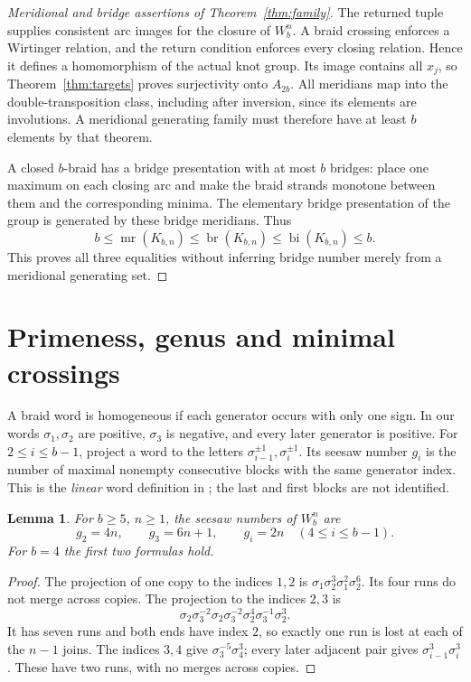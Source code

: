 \documentclass[11pt]{article}
\newtheorem{lemma}[theorem]{Lemma}
\newcommand{\mr}{\operatorname{mr}}
\newcommand{\br}{\operatorname{br}}
\newcommand{\bi}{\operatorname{bi}}
\begin{document}
\begin{proof}[Meridional and bridge assertions of Theorem~\ref{thm:family}]
The returned tuple supplies consistent arc images for the closure of
$W_b^n$. A braid crossing enforces a Wirtinger relation, and the return
condition enforces every closing relation. Hence it defines a
homomorphism of the actual knot group. Its image contains all $x_j$,
so Theorem~\ref{thm:targets} proves surjectivity onto $A_{2b}$.
All meridians map into the double-transposition class, including after
inversion, since its elements are involutions. A meridional generating
family must therefore have at least $b$ elements by that theorem.

A closed $b$-braid has a bridge presentation with at most $b$ bridges:
place one maximum on each closing arc and make the braid strands
monotone between them and the corresponding minima. The elementary
bridge presentation of the group is generated by these bridge
meridians. Thus
\[
 b\le\mr(K_{b,n})\le\br(K_{b,n})\le\bi(K_{b,n})\le b.
\]
This proves all three equalities without inferring bridge number merely
from a meridional generating set.
\end{proof}

\section{Primeness, genus and minimal crossings}

A braid word is homogeneous if each generator occurs with only one
sign. In our words $\sigma_1,\sigma_2$ are positive, $\sigma_3$ is
negative, and every later generator is positive.
For $2\le i\le b-1$, project a word to the letters
$\sigma_{i-1}^{\pm1},\sigma_i^{\pm1}$. Its seesaw number $g_i$ is the
number of maximal nonempty consecutive blocks with the same generator
index. This is the \emph{linear} word definition in
\cite[Section~5.2, printed p.~20]{flo}; the last and first blocks are not
identified.

\begin{lemma}\label{lem:seesaws}
For $b\ge5$, $n\ge1$, the seesaw numbers of $W_b^n$ are
\[
 g_2=4n,\qquad g_3=6n+1,\qquad g_i=2n\quad(4\le i\le b-1).
\]
For $b=4$ the first two formulas hold.
\end{lemma}
\begin{proof}
The projection of one copy to the indices $1,2$ is
$\sigma_1\sigma_2^3\sigma_1^2\sigma_2^6$. Its four runs do not merge
across copies. The projection to the indices $2,3$ is
\[
 \sigma_2\sigma_3^{-2}\sigma_2\sigma_3^{-2}
 \sigma_2^4\sigma_3^{-1}\sigma_2^3.
\]
It has seven runs and both ends have index $2$, so exactly one run is
lost at each of the $n-1$ joins. The indices $3,4$ give
$\sigma_3^{-5}\sigma_4^3$; every later adjacent pair gives
$\sigma_{i-1}^3\sigma_i^3$. These have two runs, with no merges across
copies.
\end{proof}
\end{document}
